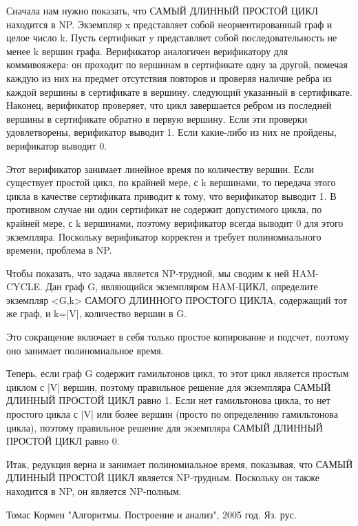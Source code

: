 \documentclass[spec, och, labwork]{../shiza}
\begin{document}
Сначала нам нужно показать, что САМЫЙ ДЛИННЫЙ ПРОСТОЙ ЦИКЛ находится в NP. Экземпляр x представляет собой 
неориентированный граф и целое число k. Пусть сертификат y представляет собой последовательность не менее k 
вершин графа. Верификатор аналогичен верификатору для коммивояжера: он проходит по вершинам в сертификате одну 
за другой, помечая каждую из них на предмет отсутствия повторов и проверяя наличие ребра из каждой вершины в 
сертификате в вершину. следующий указанный в сертификате. Наконец, верификатор проверяет, что цикл завершается 
ребром из последней вершины в сертификате обратно в первую вершину. Если эти проверки удовлетворены, верификатор 
выводит 1. Если какие-либо из них не пройдены, верификатор выводит 0.

Этот верификатор занимает линейное время по количеству вершин. Если существует простой цикл, по крайней мере, с k 
вершинами, то передача этого цикла в качестве сертификата приводит к тому, что верификатор выводит 1. В противном 
случае ни один сертификат не содержит допустимого цикла, по крайней мере, с k вершинами, поэтому верификатор всегда
выводит 0 для этого экземпляра. Поскольку верификатор корректен и требует полиномиального времени, проблема в NP.

Чтобы показать, что задача является NP-трудной, мы сводим к ней HAM-CYCLE. Дан граф G, являющийся экземпляром HAM-ЦИКЛ,
определите экземпляр <G,k> САМОГО ДЛИННОГО ПРОСТОГО ЦИКЛА, содержащий тот же граф, и k=|V|, количество вершин в G.

Это сокращение включает в себя только простое копирование и подсчет, поэтому оно занимает полиномиальное время.

Теперь, если граф G содержит гамильтонов цикл, то этот цикл является простым циклом с |V| вершин, поэтому 
правильное решение для экземпляра САМЫЙ ДЛИННЫЙ ПРОСТОЙ ЦИКЛ равно 1. Если нет гамильтонова цикла, то нет простого
цикла с |V| или более вершин (просто по определению гамильтонова цикла), поэтому правильное решение для экземпляра
САМЫЙ ДЛИННЫЙ ПРОСТОЙ ЦИКЛ равно 0.

Итак, редукция верна и занимает полиномиальное время, показывая, что САМЫЙ ДЛИННЫЙ ПРОСТОЙ ЦИКЛ является NP-трудным.
Поскольку он также находится в NP, он является NP-полным.

\newpage
    
\begin{thebibliography}{3}
        Томас Кормен "Алгоритмы. Построение и анализ", 2005 год. Яз. рус.
    \end{thebibliography}
\end{document}
